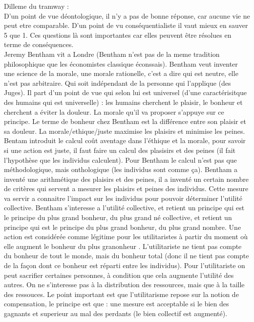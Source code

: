 \documentclass{article}
\begin{document}
Dilleme du tramway : \\
D'un point de vue déontologique, il n'y a pas de bonne réponse, car aucune vie ne peut etre
comparable.
D'un point de vu conséquentialiste il vaut mieux en sauver 5 que 1.
Ces questions là sont importantes car elles peuvent être résolues en terme de conséquences. \\

Jeremy Bentham vit a Londre (Bentham n'est pas de la meme tradition philosophique que les
économistes classique éconssais). Bentham veut inventer une science de la morale, une morale
rationelle, c'est a dire qui est neutre, elle n'est pas arbitraire. Qui soit indépendant de la
personne qui l'applique (des Juges). Il part d'un point de vue qui selon lui est universel (d'une
caractérisitque des humains qui est universelle) : les humains cherchent le plaisir, le bonheur et
cherchent a éviter la douleur. La morale qu'il va proposer s'appuye sur ce principe. Le terme de
bonheur chez Bentham est la différence entre son plaisir et sa douleur. La morale/ethique/juste
maximise les plaisirs et minimise les peines. Bentam introduit le calcul coût aventage dans
l'éthique et la morale, pour savoir si une action est juste, il faut faire un calcul des plasisirs
et des peines (il fait l'hypothèse que les individus calculent). Pour Bentham le calcul n'est pas
que méthodologique, mais onthologique (les individus sont comme ça). Bentham a inventé une
arithmétique des plaisirs et des peines, il a inventé un certain nombre de critères qui servent a
mesurer les plaisirs et peines des individus. Cette mesure va servir a connaitre l'impact sur les
individus pour pouvoir déterminer l'utilité collective. Bentham s'interesse a l'utilité collective,
et retient un principe qui est le principe du plus grand bonheur, du plus grand né collective, et
retient un principe qui est le principe du plus grand bonheur, du plus grand nombre. Une action est
considérée comme légitime pour les utilitaristes à partir du moment où elle augment le bonheur du
plus granonheur . L'utilitariste ne tient pas compte du bonheur de tout le monde, mais du bonheur
total (donc il ne tient pas compte de la façon dont ce bonheur est réparti entre les individus).
Pour l'utilitariste on peut sacrifier certaines personnes, à condition que cela augmente
l'utilité des autres. On ne s'interesse pas à la distribution des ressources, mais que à la taille
des ressouces. Le point important est que l'utilitarisme repose sur la notion de compensation, le
principe est que : une mesure est acceptable si le bien des gagnants et superieur au mal des
perdants (le bien collectif est augmenté).
\end{document}
